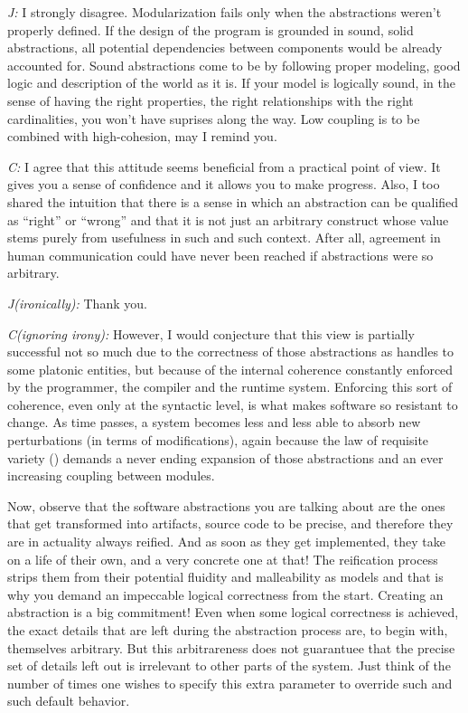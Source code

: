 \documentclass[10pt]{sigplanconf}
\begin{document}
\emph{J:} I strongly disagree. Modularization fails only when the abstractions weren't properly defined. If the design of the program is grounded in sound, solid abstractions, all potential dependencies between components would be already accounted for. Sound abstractions come to be by following proper modeling, good logic and description of the world as it is. If your model is logically sound, in the sense of having the right properties, the right relationships with the right cardinalities, you won't have suprises along the way. Low coupling is to be combined with high-cohesion, may I remind you.

\emph{C:} I agree that this attitude seems beneficial from a practical point of view. It gives you a sense of confidence and it allows you to make progress. Also, I too shared the intuition that there is a sense in which an abstraction can be qualified as ``right'' or ``wrong'' and that it is not just an arbitrary construct whose value stems purely from usefulness in such and such context. After all, agreement in human communication could have never been reached if abstractions were so arbitrary.

\emph{J(ironically):} Thank you.

\emph{C(ignoring irony):} However, I would conjecture that this view is partially successful not so much due to the correctness of those abstractions as handles to some platonic entities, but because of the internal coherence constantly enforced by the programmer, the compiler and the runtime system. Enforcing this sort of coherence, even only at the syntactic level, is what makes software so resistant to change. As time passes, a system becomes less and less able to absorb new perturbations (in terms of modifications), again because the law of requisite variety (\cite{ashby}) demands a never ending expansion of those abstractions and an ever increasing coupling between modules.

Now, observe that the software abstractions you are talking about are the ones that get transformed into artifacts, source code to be precise, and therefore they are in actuality always reified. And as soon as they get implemented, they take on a life of their own, and a very concrete one at that! The reification process strips them from their potential fluidity and malleability as models and that is why you demand an impeccable logical correctness from the start. Creating an abstraction is a big commitment! Even when some logical correctness is achieved, the exact details that are left during the abstraction process are, to begin with, themselves arbitrary. But this arbitrareness does not guarantuee that the precise set of details left out is irrelevant to other parts of the system. Just think of the number of times one wishes to specify this extra parameter to override such and such default behavior.
\end{document}

